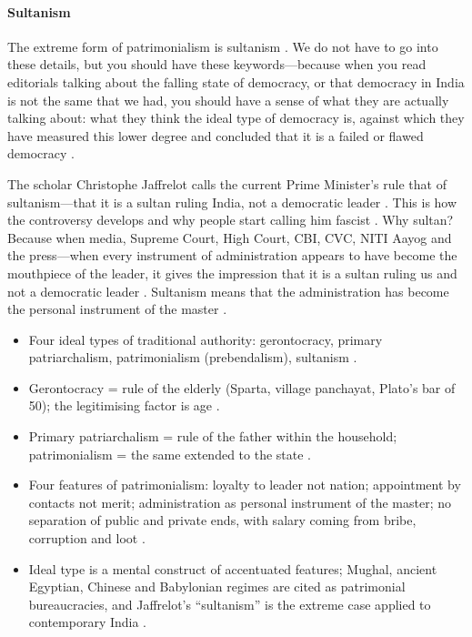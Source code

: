 \paragraph{Sultanism}
The extreme form of patrimonialism is sultanism . We do not have to go into these details, but you should have these keywords---because when you read editorials talking about the falling state of democracy, or that democracy in India is not the same that we had, you should have a sense of what they are actually talking about: what they think the ideal type of democracy is, against which they have measured this lower degree and concluded that it is a failed or flawed democracy .

\begin{GovtPolicy}
The scholar Christophe Jaffrelot calls the current Prime Minister's rule that of sultanism---that it is a sultan ruling India, not a democratic leader . This is how the controversy develops and why people start calling him fascist .
Why sultan? Because when media, Supreme Court, High Court, CBI, CVC, NITI Aayog and the press---when every instrument of administration appears to have become the mouthpiece of the leader, it gives the impression that it is a sultan ruling us and not a democratic leader . Sultanism means that the administration has become the personal instrument of the master .
\end{GovtPolicy}

\begin{QuickRevision}
\begin{itemize}
    \item Four ideal types of traditional authority: gerontocracy, primary patriarchalism, patrimonialism (prebendalism), sultanism .
    \item Gerontocracy = rule of the elderly (Sparta, village panchayat, Plato's bar of 50); the legitimising factor is age .
    \item Primary patriarchalism = rule of the father within the household; patrimonialism = the same extended to the state .
    \item Four features of patrimonialism: loyalty to leader not nation; appointment by contacts not merit; administration as personal instrument of the master; no separation of public and private ends, with salary coming from bribe, corruption and loot .
    \item Ideal type is a mental construct of accentuated features; Mughal, ancient Egyptian, Chinese and Babylonian regimes are cited as patrimonial bureaucracies, and Jaffrelot's ``sultanism'' is the extreme case applied to contemporary India .
\end{itemize}
\end{QuickRevision}

